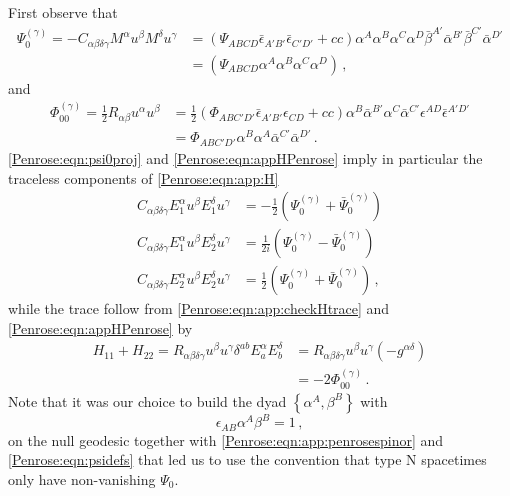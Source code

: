 First observe that
\begin{equation}\label{Penrose:eqn:psi0proj}
\begin{aligned}
\Psi^{(\gamma)}_0 = -C_{\alpha \beta \delta \gamma} M^{\alpha} u^{\beta} M^{\delta} u^{\gamma} &=  \left(\Psi_{ABCD}\bar{\epsilon}_{A'B'}\bar{\epsilon}_{C'D'}+cc\right)\alpha^A \alpha^B \alpha^C  \alpha^D \bar{\beta}^{A'} \bar{\alpha}^{B'}  \bar{\beta}^{C'} \bar{\alpha}^{D'} \\
&=  \left(\Psi_{ABCD}\alpha^A \alpha^B \alpha^C \alpha^D\right)  \, ,
\end{aligned}
\end{equation}
and
\begin{equation}\label{Penrose:eqn:app:checkHtrace}
\begin{aligned}
\Phi^{(\gamma)}_{00} = \frac{1}{2}R_{\alpha \beta} u^{\alpha} u^{\beta}  &=  \frac{1}{2}\left(\Phi_{ABC'D'} \bar{\epsilon}_{A'B'} \epsilon_{CD} + cc\right) \alpha^B \bar{\alpha}^{B'}  \alpha^C \bar{\alpha}^{C'}  \epsilon^{AD}\bar{\epsilon}^{A'D'} \\
&=  \Phi_{ABC'D'} \alpha^B  \alpha^A \bar{\alpha}^{C'} \bar{\alpha}^{D'}    \, .
\end{aligned}
\end{equation}
\eqref{Penrose:eqn:psi0proj} and \eqref{Penrose:eqn:appHPenrose} imply in particular the traceless components of \eqref{Penrose:eqn:app:H}
\begin{equation}
\begin{aligned}
C_{\alpha \beta \delta \gamma} E^{\alpha}_1 u^{\beta} E^{\delta}_1 u^{\gamma} &=   
-\frac{1}{2}\left(\Psi^{(\gamma)}_0  +\bar{\Psi}^{(\gamma)}_0\right) \\
C_{\alpha \beta \delta \gamma} E^{\alpha}_1 u^{\beta} E^{\delta}_2 u^{\gamma} &=   \frac{1}{2i} \left(\Psi^{(\gamma)}_0 - \bar{\Psi}^{(\gamma)}_0\right) \\
C_{\alpha \beta \delta \gamma} E^{\alpha}_2 u^{\beta} E^{\delta}_2 u^{\gamma} &=   \frac{1}{2}\left(\Psi^{(\gamma)}_0  +\bar{\Psi}^{(\gamma)}_0\right)  \, ,
\end{aligned}
\end{equation}
while the trace follow from  \eqref{Penrose:eqn:app:checkHtrace}  and \eqref{Penrose:eqn:appHPenrose}  by
\begin{equation}
\begin{aligned}
H_{11}+H_{22} = R_{\alpha \beta \delta \gamma} u^{\beta} u^{\gamma} \delta^{ab} E_a^{\alpha} E_b^{\delta} &= R_{\alpha \beta \delta \gamma} u^{\beta} u^{\gamma} (-g^{\alpha \delta}) \\
&= - 2 \Phi^{(\gamma)}_{00}  \, .
\end{aligned}
\end{equation}
Note that it was our choice to build the dyad $\left\lbrace \alpha^A, \beta^B \right\rbrace$ with
\begin{equation}
	\epsilon_{AB} \alpha^A \beta^B = 1 \, ,
\end{equation}
on the null geodesic together with \eqref{Penrose:eqn:app:penrosespinor} and \eqref{Penrose:eqn:psidefs} that led us to use the convention that type N spacetimes only have non-vanishing $\Psi_0$. 

